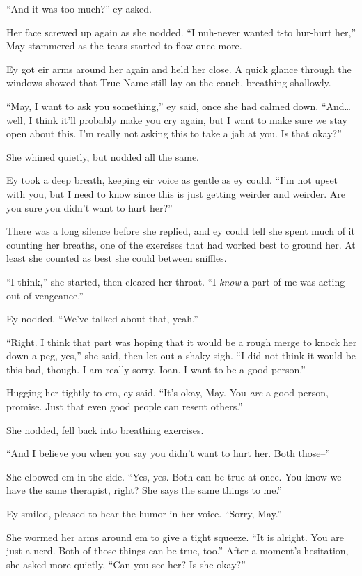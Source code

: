 ``And it was too much?'' ey asked.

Her face screwed up again as she nodded. ``I nuh-never wanted t-to hur-hurt her,'' May stammered as the tears started to flow once more.

Ey got eir arms around her again and held her close. A quick glance through the windows showed that True Name still lay on the couch, breathing shallowly.

``May, I want to ask you something,'' ey said, once she had calmed down. ``And\ldots well, I think it'll probably make you cry again, but I want to make sure we stay open about this. I'm really not asking this to take a jab at you. Is that okay?''

She whined quietly, but nodded all the same.

Ey took a deep breath, keeping eir voice as gentle as ey could. ``I'm not upset with you, but I need to know since this is just getting weirder and weirder. Are you sure you didn't want to hurt her?''

There was a long silence before she replied, and ey could tell she spent much of it counting her breaths, one of the exercises that had worked best to ground her. At least she counted as best she could between sniffles.

``I think,'' she started, then cleared her throat. ``I \emph{know} a part of me was acting out of vengeance.''

Ey nodded. ``We've talked about that, yeah.''

``Right. I think that part was hoping that it would be a rough merge to knock her down a peg, yes,'' she said, then let out a shaky sigh. ``I did not think it would be this bad, though. I am really sorry, Ioan. I want to be a good person.''

Hugging her tightly to em, ey said, ``It's okay, May. You \emph{are} a good person, promise. Just that even good people can resent others.''

She nodded, fell back into breathing exercises.

``And I believe you when you say you didn't want to hurt her. Both those--''

She elbowed em in the side. ``Yes, yes. Both can be true at once. You know we have the same therapist, right? She says the same things to me.''

Ey smiled, pleased to hear the humor in her voice. ``Sorry, May.''

She wormed her arms around em to give a tight squeeze. ``It is alright. You are just a nerd. Both of those things can be true, too.'' After a moment's hesitation, she asked more quietly, ``Can you see her? Is she okay?''

